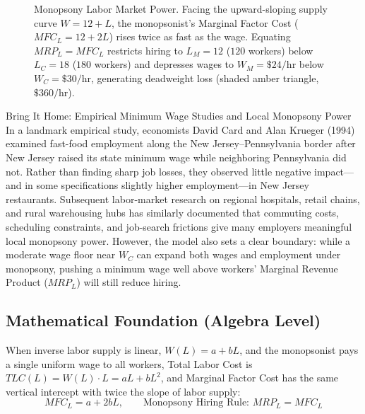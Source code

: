 \documentclass[11pt,letterpaper]{article}
\begin{document}
\begin{figure}[htbp]
\caption{Monopsony Labor Market Power. Facing the upward-sloping supply curve $W = 12 + L$, the monopsonist's Marginal Factor Cost ($MFC_L = 12 + 2L$) rises twice as fast as the wage. Equating $MRP_L = MFC_L$ restricts hiring to $L_M = 12$ ($120$ workers) below $L_C = 18$ ($180$ workers) and depresses wages to $W_M = \$24/\text{hr}$ below $W_C = \$30/\text{hr}$, generating deadweight loss (shaded amber triangle, $\$360/\text{hr}$).}
\label{fig:monopsony_labor}
\end{figure}

\begin{examplecase}{Bring It Home: Empirical Minimum Wage Studies and Local Monopsony Power}
In a landmark empirical study, economists David Card and Alan Krueger (1994) examined fast-food employment along the New Jersey--Pennsylvania border after New Jersey raised its state minimum wage while neighboring Pennsylvania did not. Rather than finding sharp job losses, they observed little negative impact---and in some specifications slightly higher employment---in New Jersey restaurants. Subsequent labor-market research on regional hospitals, retail chains, and rural warehousing hubs has similarly documented that commuting costs, scheduling constraints, and job-search frictions give many employers meaningful local monopsony power. However, the model also sets a clear boundary: while a moderate wage floor near $W_C$ can expand both wages and employment under monopsony, pushing a minimum wage well above workers' Marginal Revenue Product ($MRP_L$) will still reduce hiring.
\end{examplecase}

\subsection*{Mathematical Foundation (Algebra Level)}
When inverse labor supply is linear, $W(L) = a + bL$, and the monopsonist pays a single uniform wage to all workers, Total Labor Cost is $TLC(L) = W(L) \cdot L = aL + bL^2$, and Marginal Factor Cost has the same vertical intercept with twice the slope of labor supply:
\begin{equation}
MFC_L = a + 2bL, \qquad \text{Monopsony Hiring Rule: } MRP_L = MFC_L
\end{equation}
\end{document}
